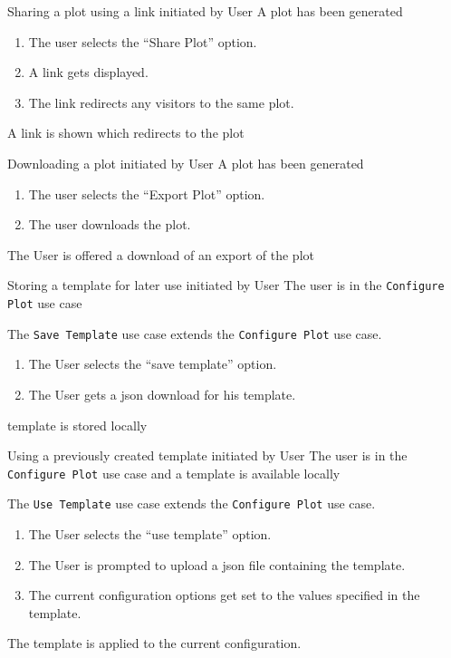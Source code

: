 \bigskip

{Sharing a \gls{plot} using a link}
{initiated by User}
{A \gls{plot} has been generated}
{\begin{enumerate}
    \item The user selects the \enquote{Share Plot} option.
    \item A link gets displayed.
    \item The link redirects any visitors to the same \gls{plot}.
\end{enumerate}}
{A link is shown which redirects to the \gls{plot}}

\bigskip

{Downloading a plot}
{initiated by User}
{A \gls{plot} has been generated}
{\begin{enumerate}
    \item The user selects the \enquote{Export Plot} option.
    \item The user downloads the \gls{plot}.
\end{enumerate}}
{The User is offered a download of an export of the \gls{plot}}

\bigskip

{Storing a \gls{template} for later use}
{initiated by User}
{The user is in the \texttt{Configure Plot} use case}
{The \texttt{Save Template} use case extends the \texttt{Configure Plot} use case.
\begin{enumerate}
    \item The User selects the \enquote{save template} option.
    \item The User gets a \gls{json} download for his \gls{template}.
\end{enumerate}}
{\Gls{template} is stored locally}

\bigskip

{Using a previously created template}
{initiated by User}
{The user is in the \texttt{Configure Plot} use case and a \gls{template} is available locally}
{The \texttt{Use Template} use case extends the \texttt{Configure Plot} use case.
\begin{enumerate}
    \item The User selects the \enquote{use template} option.
    \item The User is prompted to upload a \gls{json} file containing the \gls{template}.
    \item The current \gls{configuration} options get set to the values specified in the template.
\end{enumerate}}
{The \gls{template} is applied to the current configuration.}

